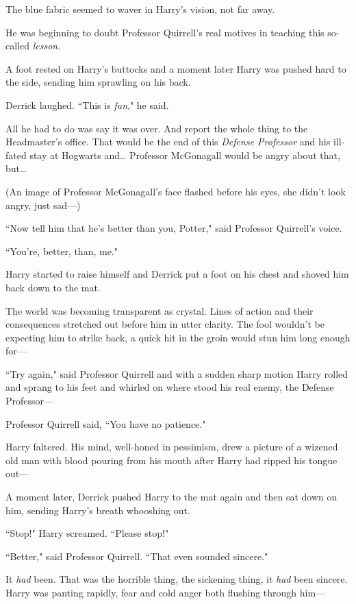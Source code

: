 The blue fabric seemed to waver in Harry's vision, not far away.

He was beginning to doubt Professor Quirrell's real motives in teaching this so-called \emph{lesson}.

A foot rested on Harry's buttocks and a moment later Harry was pushed hard to the side, sending him sprawling on his back.

Derrick laughed. ``This is \emph{fun}," he said.

All he had to do was say it was over. And report the whole thing to the Headmaster's office. That would be the end of this \emph{Defense Professor} and his ill-fated stay at Hogwarts and{\ldots} Professor McGonagall would be angry about that, but{\ldots}

(An image of Professor McGonagall's face flashed before his eyes, she didn't look angry, just sad—)

``Now tell him that he's better than you, Potter," said Professor Quirrell's voice.

``You're, better, than, me."

Harry started to raise himself and Derrick put a foot on his chest and shoved him back down to the mat.

The world was becoming transparent as crystal. Lines of action and their consequences stretched out before him in utter clarity. The fool wouldn't be expecting him to strike back, a quick hit in the groin would stun him long enough for—

``Try again," said Professor Quirrell and with a sudden sharp motion Harry rolled and sprang to his feet and whirled on where stood his real enemy, the Defense Professor—

Professor Quirrell said, ``You have no patience."

Harry faltered. His mind, well-honed in pessimism, drew a picture of a wizened old man with blood pouring from his mouth after Harry had ripped his tongue out—

A moment later, Derrick pushed Harry to the mat again and then sat down on him, sending Harry's breath whooshing out.

``Stop!" Harry screamed. ``Please stop!"

``Better," said Professor Quirrell. ``That even sounded sincere."

It \emph{had} been. That was the horrible thing, the sickening thing, it \emph{had} been sincere. Harry was panting rapidly, fear and cold anger both flushing through him—

